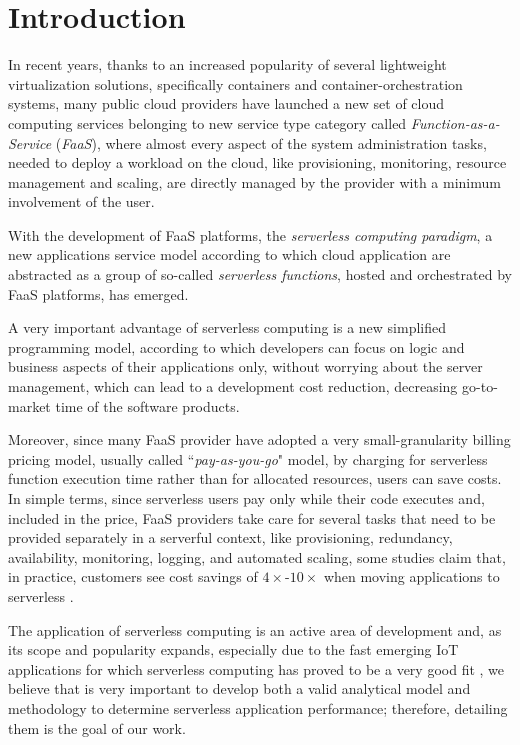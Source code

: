 \documentclass[12pt,a4paper]{report}
\newcommand{\ItalicQuotMark}[1]{``\textit{#1}"}
\begin{document}
\tableofcontents	
\listoffigures
\listoftables

\listofalgorithms
{}

\chapter{Introduction}\label{chapterIntro}

In recent years, thanks to an increased popularity of several lightweight virtualization solutions, specifically containers and container-orchestration systems, many public cloud providers have launched a new set of cloud computing services belonging to new service type category called \textit{Function-as-a-Service} (\textit{FaaS}), where almost every aspect of the system administration tasks, needed to deploy a workload on the cloud, like provisioning, monitoring, resource management and scaling, are directly managed by the provider with a minimum involvement of the user.

With the development of FaaS platforms, the \textit{serverless computing paradigm}, a new applications service model according to which cloud application are abstracted as a group of so-called \textit{serverless functions}, hosted and orchestrated by FaaS platforms, has emerged. 

A very important advantage of serverless computing is a new simplified programming model, according to which developers can focus on logic and business aspects of their applications only, without worrying about the server management, which can lead to a development cost reduction, decreasing go-to-market time of the software products.

Moreover, since many FaaS provider have adopted a very small-granularity billing pricing model, usually called \ItalicQuotMark{pay-as-you-go} model, by charging for serverless function execution time rather than for allocated resources, users can save costs. In simple terms, since serverless users pay only while their code executes and, included in the price, FaaS providers take care for several tasks that need to be provided separately in a serverful context, like  provisioning, redundancy, availability, monitoring, logging, and automated scaling, some studies claim that, in practice, customers see cost savings of $4\times$-$10\times$ when moving applications to serverless \cite{NextPhase}.

The application of serverless computing is an active area of development and, as its scope and popularity expands, especially due to the fast emerging IoT applications for which serverless computing has proved to be a very good fit \cite{IoTFaaS}, we believe that is very important to develop both a valid analytical model and methodology to determine serverless application performance; therefore, detailing them is the goal of our work.
\end{document}

